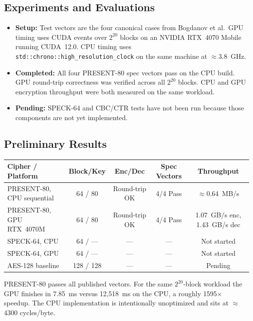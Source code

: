 \documentclass[10pt]{article}
\begin{document}
\subsection*{Experiments and Evaluations}
\begin{itemize}
  \item \textbf{Setup:} Test vectors are the four canonical cases from Bogdanov et al.\
        GPU timing uses CUDA events over $2^{20}$ blocks on an NVIDIA RTX~4070 Mobile
        running CUDA~12.0. CPU timing uses \texttt{std::chrono::high\_resolution\_clock}
        on the same machine at $\approx$3.8~GHz.

  \item \textbf{Completed:} All four PRESENT-80 spec vectors pass on the CPU build.
        GPU round-trip correctness was verified across all $2^{20}$ blocks. CPU and GPU
        encryption throughput were both measured on the same workload.

  \item \textbf{Pending:} SPECK-64 and CBC/CTR tests have not been run because those
        components are not yet implemented.
\end{itemize}

\subsection*{Preliminary Results}

\begin{table}[h]
\centering
\small
\begin{tabular}{lcccc}
\toprule
\textbf{Cipher / Platform} & \textbf{Block/Key} & \textbf{Enc/Dec} & \textbf{Spec Vectors} & \textbf{Throughput} \\
\midrule
PRESENT-80, CPU sequential & 64 / 80  & Round-trip OK & 4/4 Pass & $\approx$0.64~MB/s \\
PRESENT-80, GPU RTX~4070M  & 64 / 80  & Round-trip OK & 4/4 Pass & 1.07~GB/s enc, 1.43~GB/s dec \\
SPECK-64, CPU              & 64 / --- & ---           & ---      & Not started \\
SPECK-64, GPU              & 64 / --- & ---           & ---      & Not started \\
AES-128 baseline           & 128 / 128 & ---          & ---      & Pending \\
\bottomrule
\end{tabular}
\end{table}

PRESENT-80 passes all published vectors. For the same $2^{20}$-block workload the GPU
finishes in 7.85~ms versus 12{,}518~ms on the CPU, a roughly 1595$\times$ speedup.
The CPU implementation is intentionally unoptimized and sits at $\approx$4300 cycles/byte.
\end{document}
